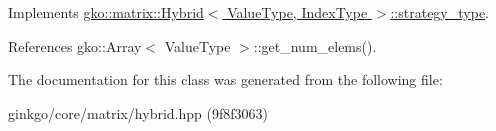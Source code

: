 Implements \hyperlink{classgko_1_1matrix_1_1Hybrid_1_1strategy__type_a0a0cd4024f27c7d0f286f35fc0a6de60}{gko\+::matrix\+::\+Hybrid$<$ Value\+Type, Index\+Type $>$\+::strategy\+\_\+type}.



References gko\+::\+Array$<$ Value\+Type $>$\+::get\+\_\+num\+\_\+elems().



The documentation for this class was generated from the following file\+:\begin{DoxyCompactItemize}
\item 
ginkgo/core/matrix/hybrid.\+hpp (9f8f3063)\end{DoxyCompactItemize}

